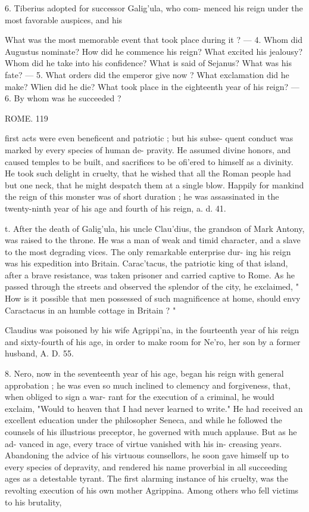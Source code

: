 \documentclass[openany,a4paper]{memoir}
\begin{document}
6. Tiberius adopted for successor Galig'ula, who com- 
menced his reign under the most favorable auspices, and his 

What was the most memorable event that took place during it ? — 4. 
Whom did Augustus nominate? How did he commence his reign? 
What excited his jealousy? Whom did he take into his confidence? 
What is said of Sejanus? What was his fate? — 5. What orders did 
the emperor give now ? What exclamation did he make? Wlien did 
he die? What took place in the eighteenth year of his reign? — 6. 
By whom was he succeeded ? 



ROME. 119 

first acts were even beneficent and patriotic ; but his subse- 
quent conduct was marked by every species of human de- 
pravity. He assumed divine honors, and caused temples to 
be built, and sacrifices to be ofi'ered to himself as a divinity. 
He took such delight in cruelty, that he wished that all the 
Roman people had but one neck, that he might despatch 
them at a single blow. Happily for mankind the reign of this 
monster was of short duration ; he was assassinated in the 
twenty-ninth year of his age and fourth of his reign, a. d. 41. 

t. After the death of Galig'ula, his uncle Clau'dius, the 
grandson of Mark Antony, was raised to the throne. He 
was a man of weak and timid character, and a slave to the 
most degrading vices. The only remarkable enterprise dur- 
ing his reign was his expedition into Britain. Carac'tacus, 
the patriotic king of that island, after a brave resistance, was 
taken prisoner and carried captive to Rome. As he passed 
through the streets and observed the splendor of the city, he 
exclaimed, " How is it possible that men possessed of such 
magnificence at home, should envy Caractacus in an humble 
cottage in Britain ? " 

Claudius was poisoned by his wife Agrippi'na, in the 
fourteenth year of his reign and sixty-fourth of his age, in 
order to make room for Ne'ro, her son by a former husband, 
A. D. 55. 

8. Nero, now in the seventeenth year of his age, began his 
reign with general approbation ; he was even so much inclined 
to clemency and forgiveness, that, when obliged to sign a war- 
rant for the execution of a criminal, he would exclaim, 
"Would to heaven that I had never learned to write." He 
had received an excellent education under the philosopher 
Seneca, and while he followed the counsels of his illustrious 
preceptor, he governed with much applause. But as he ad- 
vanced in age, every trace of virtue vanished with his in- 
creasing years. Abandoning the advice of his virtuous 
counsellors, he soon gave himself up to every species of 
depravity, and rendered his name proverbial in all succeeding 
ages as a detestable tyrant. The first alarming instance of 
his cruelty, was the revolting execution of his own mother 
Agrippina. Among others who fell victims to his brutality, 
\end{document}
